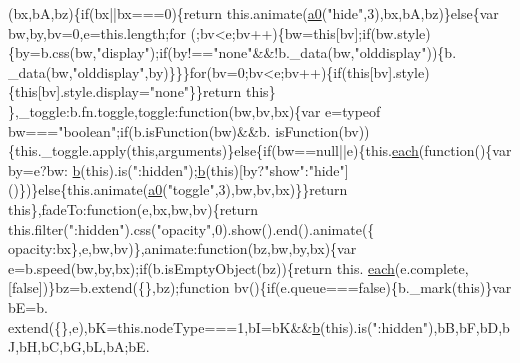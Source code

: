 \begin{DoxyCode}
      (bx,bA,bz)\{\textcolor{keywordflow}{if}(bx||bx===0)\{\textcolor{keywordflow}{return} this.animate(\hyperlink{jquery_8js_ab5b2b69c05d6a629ddd1deebef38735e}{a0}(\textcolor{stringliteral}{"hide"},3),bx,bA,bz)\}\textcolor{keywordflow}{else}\{var bw,by,bv=0,e=this.length;\textcolor{keywordflow}{for}
      (;bv<e;bv++)\{bw=\textcolor{keyword}{this}[bv];\textcolor{keywordflow}{if}(bw.style)\{by=b.css(bw,\textcolor{stringliteral}{"display"});\textcolor{keywordflow}{if}(by!==\textcolor{stringliteral}{"none"}&&!b.\_data(bw,\textcolor{stringliteral}{"olddisplay"}))\{b.
      \_data(bw,\textcolor{stringliteral}{"olddisplay"},by)\}\}\}\textcolor{keywordflow}{for}(bv=0;bv<e;bv++)\{\textcolor{keywordflow}{if}(\textcolor{keyword}{this}[bv].style)\{\textcolor{keyword}{this}[bv].style.display=\textcolor{stringliteral}{"none"}\}\}\textcolor{keywordflow}{return} \textcolor{keyword}{this}\}
      \},\_toggle:b.fn.toggle,toggle:\textcolor{keyword}{function}(bw,bv,bx)\{var e=typeof bw===\textcolor{stringliteral}{"boolean"};\textcolor{keywordflow}{if}(b.isFunction(bw)&&b.
      isFunction(bv))\{this.\_toggle.apply(\textcolor{keyword}{this},arguments)\}\textcolor{keywordflow}{else}\{\textcolor{keywordflow}{if}(bw==null||e)\{this.\hyperlink{jquery_8js_a871ff39db627c54c710a3e9909b8234c}{each}(\textcolor{keyword}{function}()\{var by=e?bw:
      \hyperlink{jquery_8js_aa4026ad5544b958e54ce5e106fa1c805}{b}(\textcolor{keyword}{this}).is(\textcolor{stringliteral}{":hidden"});\hyperlink{jquery_8js_aa4026ad5544b958e54ce5e106fa1c805}{b}(\textcolor{keyword}{this})[by?\textcolor{stringliteral}{"show"}:\textcolor{stringliteral}{"hide"}]()\})\}\textcolor{keywordflow}{else}\{this.animate(\hyperlink{jquery_8js_ab5b2b69c05d6a629ddd1deebef38735e}{a0}(\textcolor{stringliteral}{"toggle"},3),bw,bv,bx)\}\}\textcolor{keywordflow}{return} \textcolor{keyword}{
      this}\},fadeTo:\textcolor{keyword}{function}(e,bx,bw,bv)\{\textcolor{keywordflow}{return} this.filter(\textcolor{stringliteral}{":hidden"}).css(\textcolor{stringliteral}{"opacity"},0).show().end().animate(\{
      opacity:bx\},e,bw,bv)\},animate:\textcolor{keyword}{function}(bz,bw,by,bx)\{var e=b.speed(bw,by,bx);\textcolor{keywordflow}{if}(b.isEmptyObject(bz))\{\textcolor{keywordflow}{return} this.
      \hyperlink{jquery_8js_a871ff39db627c54c710a3e9909b8234c}{each}(e.complete,[\textcolor{keyword}{false}])\}bz=b.extend(\{\},bz);\textcolor{keyword}{function} bv()\{\textcolor{keywordflow}{if}(e.queue===\textcolor{keyword}{false})\{b.\_mark(\textcolor{keyword}{this})\}var bE=b.
      extend(\{\},e),bK=this.nodeType===1,bI=bK&&\hyperlink{jquery_8js_aa4026ad5544b958e54ce5e106fa1c805}{b}(\textcolor{keyword}{this}).is(\textcolor{stringliteral}{":hidden"}),bB,bF,bD,bJ,bH,bC,bG,bL,bA;bE.

\end{DoxyCode}
